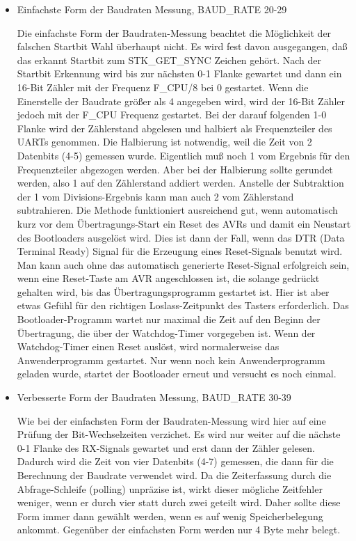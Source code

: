 \begin{itemize}

\item {Einfachste Form der Baudraten Messung, BAUD\_RATE 20-29}

Die einfachste Form der Baudraten-Messung beachtet die Möglichkeit der
falschen Startbit Wahl überhaupt nicht. Es wird fest davon ausgegangen,
daß das erkannt Startbit zum STK\_\-GET\_\-SYNC Zeichen gehört.
Nach der Startbit Erkennung wird bis zur nächsten 0-1 Flanke gewartet
und dann ein 16-Bit Zähler mit der Frequenz F\_CPU/8 bei 0 gestartet.
Wenn die Einerstelle der Baudrate größer als 4 angegeben wird, wird der
16-Bit Zähler jedoch mit der F\_CPU Frequenz gestartet.
Bei der darauf folgenden 1-0 Flanke wird der Zählerstand abgelesen
und halbiert als Frequenzteiler des UARTs genommen.
Die Halbierung ist notwendig, weil die Zeit von 2 Datenbits (4-5) gemessen wurde.
Eigentlich muß noch 1 vom Ergebnis für den Frequenzteiler abgezogen werden.
Aber bei der Halbierung sollte gerundet werden, also 1 auf den Zählerstand
addiert werden. Anstelle der Subtraktion der 1 vom Divisions-Ergebnis kann
man auch 2 vom Zählerstand subtrahieren. 
Die Methode funktioniert ausreichend gut,
wenn automatisch kurz vor dem Übertragungs-Start ein Reset des AVRs und damit
ein Neustart des Bootloaders ausgelöst wird. Dies ist dann der Fall,
wenn das DTR (Data Terminal Ready) Signal für die Erzeugung eines Reset-Signals
benutzt wird.
Man kann auch ohne das automatisch generierte Reset-Signal erfolgreich sein,
wenn eine Reset-Taste am AVR angeschlossen ist, die solange gedrückt gehalten
wird, bis das Übertragungsprogramm gestartet ist. Hier ist aber etwas
Gefühl für den richtigen Loslass-Zeitpunkt des Tasters erforderlich.
Das Bootloader-Programm wartet nur maximal die Zeit auf den Beginn der Übertragung,
die über der Watchdog-Timer vorgegeben ist.
Wenn der Watchdog-Timer einen Reset auslöst, wird normalerweise das Anwenderprogramm
gestartet. Nur wenn noch kein Anwenderprogramm geladen wurde,
startet der Bootloader erneut und versucht es noch einmal.

\item {Verbesserte Form der Baudraten Messung, BAUD\_RATE 30-39}

Wie bei der einfachsten Form der Baudraten-Messung wird hier auf eine Prüfung
der Bit-Wechselzeiten verzichet.
Es wird nur weiter auf die nächste 0-1 Flanke des RX-Signals
gewartet und erst dann der Zähler gelesen.
Dadurch wird die Zeit von vier Datenbits (4-7) gemessen, die dann für die Berechnung
der Baudrate verwendet wird.
Da die Zeiterfassung durch die Abfrage-Schleife (polling) unpräzise ist,
wirkt dieser mögliche Zeitfehler weniger, wenn er durch vier statt durch
zwei geteilt wird.  
Daher sollte diese Form immer dann gewählt werden, wenn es auf wenig Speicherbelegung
ankommt. Gegenüber der einfachsten Form werden nur 4 Byte mehr belegt.


\end{itemize}
